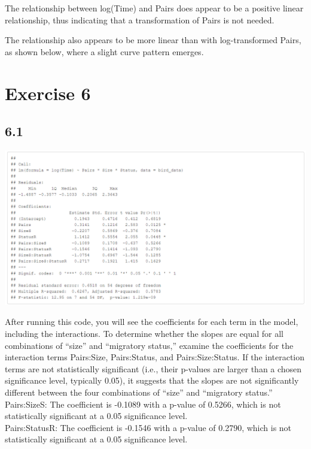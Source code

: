 \documentclass{article}
\begin{document}
The relationship between log(Time) and Pairs does appear to be a positive linear relationship, thus indicating that a transformation of Pairs is not needed.

The relationship also appears to be more linear than with log-transformed Pairs, as shown below, where a slight curve pattern emerges.



\section{Exercise 6}

\subsection*{6.1}

\begin{center}
\includegraphics[scale=0.5]{tables/log-time.png}
\end{center}


After running this code, you will see the coefficients for each term in the model, including the interactions. To determine whether the slopes are equal for all combinations of “size” and “migratory status,” examine the coefficients for the interaction terms Pairs:Size, Pairs:Status, and Pairs:Size:Status. If the interaction terms are not statistically significant (i.e., their p-values are larger than a chosen significance level, typically 0.05), it suggests that the slopes are not significantly different between the four combinations of “size” and “migratory status.” \\

Pairs:SizeS: The coefficient is -0.1089 with a p-value of 0.5266, which is not statistically significant at a 0.05 significance level. \\

Pairs:StatusR: The coefficient is -0.1546 with a p-value of 0.2790, which is not statistically significant at a 0.05 significance level. \\
\end{document}
